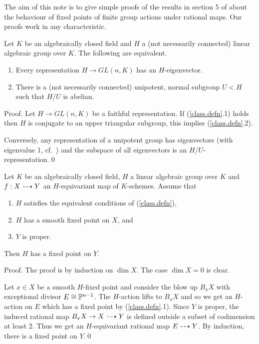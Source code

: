 The aim of this note is to give simple proofs of
the results in section 5 of
\cite{ry} about the behaviour of fixed points of finite group
actions under rational maps. Our proofs   work in any
characteristic.


\begin{lem}\label{class.defn}
 Let $K$ be an algebraically closed field and  $H$
a (not necessarily connected) linear
algebraic group over $K$.  The following are equivalent.
\begin{enumerate}
\item Every representation  $H\to GL(n,K)$ has an
$H$-eigenvector.
\item There is a  (not necessarily connected) unipotent, normal 
subgroup $U<H$ such that $H/U$ is abelian.
\end{enumerate}
\end{lem}

Proof. Let $H\to GL(n,K)$ be a faithful representation.
If (\ref{class.defn}.1) holds then $H$ is conjugate to
an upper triangular subgroup, this implies (\ref{class.defn}.2).

Conversely, any representation of a unipotent group
has eigenvectors (with eigenvalue 1, cf.\ \cite[I.4.8]{borel})
and the subspace of all eigenvectors is an
$H/U$-representation.\qed

\begin{prop}\label{Going-down}
  Let $K$ be an algebraically closed
field,
$H$ a linear  algebraic group over $K$ and $f:X\dasharrow Y$ an
$H$-equivariant map of
$K$-schemes. Assume that
\begin{enumerate}
\item $H$ satisfies the equivalent conditions
of (\ref{class.defn}),
\item $H$ has a smooth fixed point on $X$, and
\item $Y$ is proper.
\end{enumerate}
\noindent Then $H$ has a fixed point on $Y$.
\end{prop}

Proof. The proof is by induction on $\dim X$. The  case  $\dim
X=0$ is clear.

Let $x\in X$ be a smooth $H$-fixed point and consider the blow up
$B_xX$ with exceptional divisor $E\cong {\mathbb P}^{n-1}$. 
The $H$-action lifts to $B_xX$ and so we get an $H$-action on $E$
which has a fixed point by (\ref{class.defn}.1).  Since $Y$ is
proper, the induced rational map $B_xX\to X\dasharrow Y$ is defined
outside a subset of codimension at least 2. Thus we get an
$H$-equivariant rational map $E\dasharrow Y$. By induction, there is a 
fixed point on $Y$.\qed


